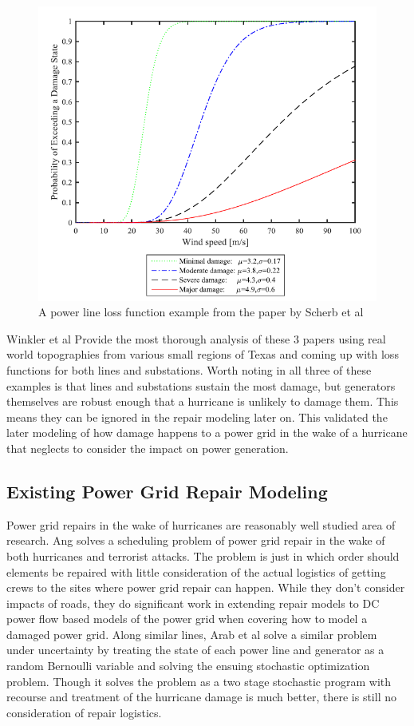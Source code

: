 \documentclass{article}
\begin{document}
			\begin{figure}[htbp]
			\centering
			\includegraphics[width=.5\linewidth]{ScherbFigure.PNG}
			\caption{A power line loss function example from the paper by Scherb et al}
		\end{figure}
		
		 Winkler et al \cite{WinklerEA2010} Provide the most thorough analysis of these 3 papers using real world topographies from various small regions of Texas and coming up with loss functions for both lines and substations. Worth noting in all three of these examples is that lines and substations sustain the most damage, but generators themselves are robust enough that a hurricane is unlikely to damage them. This means they can be ignored in the repair modeling later on. This validated the later modeling of how damage happens to a power grid in the wake of a hurricane that neglects to consider the impact on power generation.
	\subsection{Existing Power Grid Repair Modeling}
		Power grid repairs in the wake of hurricanes are reasonably well studied area of research. Ang \cite{NPSMasters} solves a scheduling problem of power grid repair in the wake of both hurricanes and terrorist attacks. The problem is just in which order should elements be repaired with little consideration of the actual logistics of getting crews to the sites where power grid repair can happen. While they don't consider impacts of roads, they do significant work in extending repair models to DC power flow based models of the power grid when covering how to model a damaged power grid. Along similar lines, Arab et al \cite{ArabEA2015} solve a similar problem under uncertainty by treating the state of each power line and generator as a random Bernoulli variable and solving the ensuing stochastic optimization problem. Though it solves the problem as a two stage stochastic program with recourse and treatment of the hurricane damage is much better, there is still no consideration of repair logistics. 
		
\end{document}

